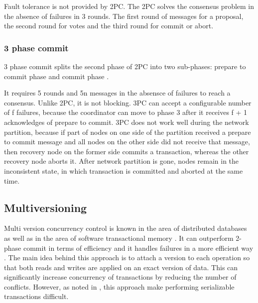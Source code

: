 \documentclass[runningheads,a4paper]{llncs}
\begin{document}
Fault tolerance is not provided by 2PC. The 2PC solves the consensus problem in the absence of failures in 3 rounds. The first  round of messages for a proposal, the second round for votes and the third round for commit or abort. 

\subsubsection{3 phase commit}

3 phase commit splits the second phase of 2PC into two sub-phases: prepare to commit phase and commit phase \cite{Bernstein:1987}.

It requires 5 rounds and 5n messages in the absensce of failures to reach a consensus.  Unlike 2PC, it is not blocking. 3PC can accept a configurable number of f failures, because the coordinator can move to phase 3 after it receives f + 1 acknowledges of prepare to commit. 3PC does not work well during the network partition, because if part of nodes on one side of the partition received a prepare to commit message and all nodes on the other side did not receive that message, then recovery node on the former side commits a transaction, whereas the other recovery node aborts it. After network partition is gone, nodes remain in the inconsistent state, in which transaction is committed and aborted at the same time.

\subsection{Multiversioning} 

Multi version concurrency control \cite{Bernstein:1983} is known in the area of distributed databases as well as in the area of software transactional memory \cite{Perelman:2010}. It can outperform 2-phase commit in terms of efficiency and it handles failures in a more efficient way \cite{Halici:1991}. The main idea behind this approach is to attach a version to each operation so that both reads and writes are applied on an exact version of data. This can significantly increase concurrency of transactions by reducing the number of conflicts. However, as noted in \cite{Faleiro:2015}, this approach make performing serializable transactions difficult.
\end{document}
